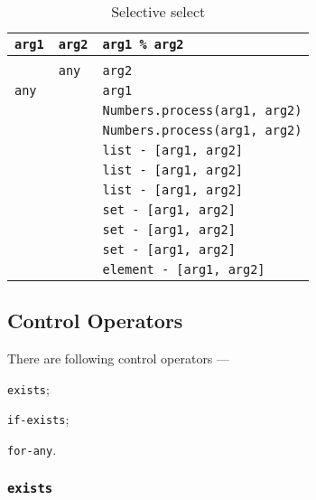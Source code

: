 \begin{table}[H]
	\caption{Selective select}
	\label{centhacktable}
	\begin{tabular}{|l|l|l|}
		\hline
		\texttt{arg1} & \texttt{arg2} & \texttt{arg1 \% arg2}			\\ \hline
		\void{}     & \void{}     & \void{}						\\ \hline
		\void{}     & \texttt{any}  & \texttt{arg2}					\\ \hline
		\texttt{any}  & \void{}     & \texttt{arg1}					\\ \hline
		\integer{}  & \integer{}  & \texttt{Numbers.process(arg1, arg2)}		\\ \hline
		\double{}   & \double{}   & \texttt{Numbers.process(arg1, arg2)}		\\ \hline
		\str{}      & \str{}      & \texttt{list - [arg1, arg2]}	\\ \hline
		\listtype{} & \str{}      & \texttt{list - [arg1, arg2]}	\\ \hline
		\listtype{} & \listtype{} & \texttt{list - [arg1, arg2]}	\\ \hline
		\object{}   & \object{}   & \texttt{set - [arg1, arg2]}	\\ \hline
		\set{}      & \object{}   & \texttt{set - [arg1, arg2]}	\\ \hline
		\set{}      & \set{}      & \texttt{set - [arg1, arg2]}	\\ \hline
		\element{}  & \element{}  & \texttt{element - [arg1, arg2]}\\ \hline
	\end{tabular}
\end{table}

\subsection{Control Operators}

There are following control operators —
\begin{icItems}
	\item \texttt{exists};
	\item \texttt{if-exists};
	\item \texttt{for-any}.
\end{icItems}

\subsubsection{\texttt{exists}}


